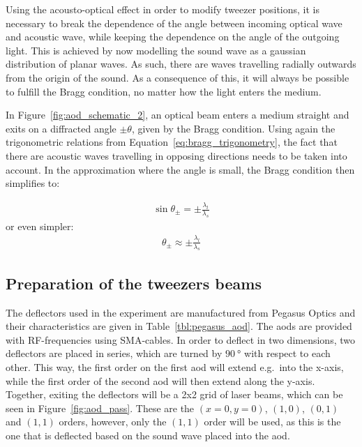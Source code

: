 
Using the acousto-optical effect in order to modify tweezer positions, it is necessary to break the dependence of the angle between incoming optical wave and acoustic wave, while keeping the dependence on the angle of the outgoing light. This is achieved by now modelling the sound wave as a gaussian distribution of planar waves. As such, there are waves travelling radially outwards from the origin of the sound. As a consequence of this, it will always be possible to fulfill the Bragg condition, no matter how the light enters the medium.

In Figure~\ref{fig:aod_schematic_2}, an optical beam enters a medium straight and exits on a diffracted angle $\pm \theta$, given by the Bragg condition. Using again the trigonometric relations from Equation~\ref{eq:bragg_trigonometry}, the fact that there are acoustic waves travelling in opposing directions needs to be taken into account. In the approximation where the angle is small, the Bragg condition then simplifies to:

\begin{align}
	\sin \theta_\pm = \pm \frac{\lambda_l}{\lambda_s}
\end{align}
or even simpler:
\begin{align}
	\theta_\pm \approx \pm \frac{\lambda_l}{\lambda_s}
\end{align}

\begin{figure}[t]
\end{figure}

\subsection{Preparation of the tweezers beams}

The deflectors used in the experiment are manufactured from Pegasus Optics and their characteristics are given in Table~\ref{tbl:pegasus_aod}. The \acp{aod} are provided with RF-frequencies using SMA-cables. In order to deflect in two dimensions, two deflectors are placed in series, which are turned by $\SI{90}{\degree}$ with respect to each other. This way, the first order on the first \ac{aod} will extend e.g.\ into the x-axis, while the first order of the second \ac{aod} will then extend along the y-axis. Together, exiting the deflectors will be a 2x2 grid of laser beams, which can be seen in Figure~\ref{fig:aod_pass}. These are the $(x=0, y=0)$, $(1, 0)$, $(0, 1)$ and $(1, 1)$ orders, however, only the $(1,1)$ order will be used, as this is the one that is deflected based on the sound wave placed into the \ac{aod}.

